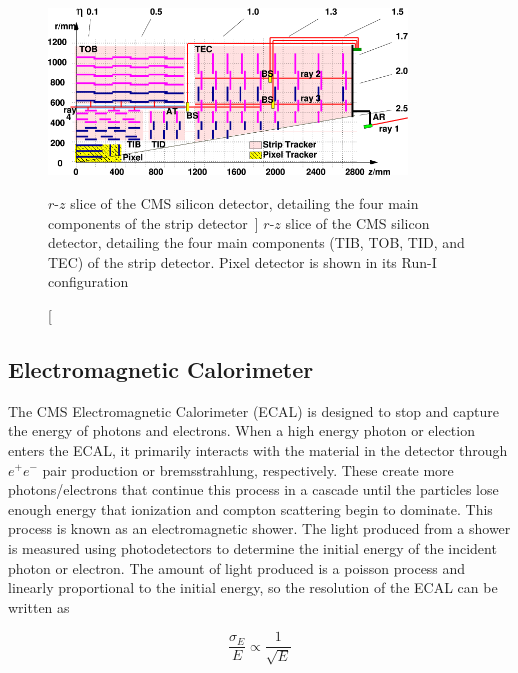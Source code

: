 \begin{figure}[htbp]
	\centering
	\includegraphics[width=0.85\textwidth]{figs/03_experiment/las.png}
	\caption
	[$r$-$z$ slice of the CMS silicon detector, detailing the four main components of the strip detector~\cite{Chatrchyan:1211825}]
	{$r$-$z$ slice of the CMS silicon detector, detailing the four main components (TIB, TOB, TID, and TEC) of the strip detector. Pixel detector is shown in its Run-I configuration~\cite{Chatrchyan:1211825}}
	\label{fig:strip}
\end{figure}

\subsection{Electromagnetic Calorimeter} \label{sec:CMS_ECAL}
The CMS Electromagnetic Calorimeter (ECAL) is designed to stop and capture the energy of photons and electrons. When a high energy photon or election enters the ECAL, it primarily interacts with the material in the detector through $e^+e^-$ pair production or bremsstrahlung, respectively. These create more photons/electrons that continue this process in a cascade until the particles lose enough energy that ionization and compton scattering begin to dominate. This process is known as an electromagnetic shower. The light produced from a shower is measured using photodetectors to determine the initial energy of the incident photon or electron. The amount of light produced is a poisson process and linearly proportional to the initial energy, so the resolution of the ECAL can be written as

\begin{equation}
	\frac{\sigma_E}{E}\propto\frac{1}{\sqrt{E}}
\end{equation}

